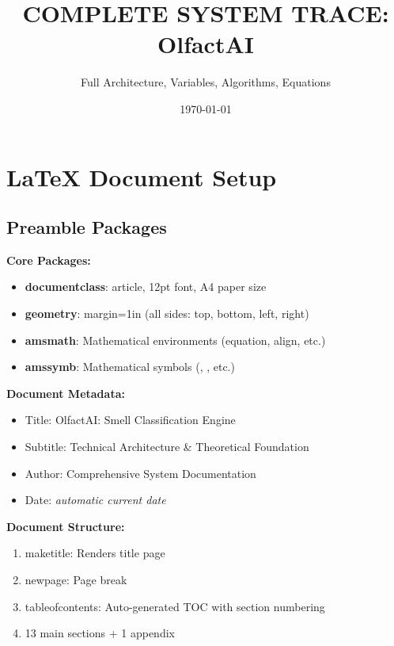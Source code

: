 \documentclass[12pt,a4paper]{article}
\title{\textbf{COMPLETE SYSTEM TRACE: OlfactAI}}
\author{Full Architecture, Variables, Algorithms, Equations}
\date{\today}
\begin{document}
\maketitle
\newpage
\tableofcontents
\newpage

\section{LaTeX Document Setup}

\subsection{Preamble Packages}

\textbf{Core Packages:}
\begin{itemize}
    \item \textbf{documentclass}: article, 12pt font, A4 paper size
    \item \textbf{geometry}: margin=1in (all sides: top, bottom, left, right)
    \item \textbf{amsmath}: Mathematical environments (equation, align, etc.)
    \item \textbf{amssymb}: Mathematical symbols (\mathbb, \mathbf, etc.)
\end{itemize}

\textbf{Document Metadata:}
\begin{itemize}
    \item Title: OlfactAI: Smell Classification Engine
    \item Subtitle: Technical Architecture \& Theoretical Foundation
    \item Author: Comprehensive System Documentation
    \item Date: \textit{automatic current date}
\end{itemize}

\textbf{Document Structure:}
\begin{enumerate}
    \item maketitle: Renders title page
    \item newpage: Page break
    \item tableofcontents: Auto-generated TOC with section numbering
    \item 13 main sections + 1 appendix
\end{enumerate}
\end{document}
